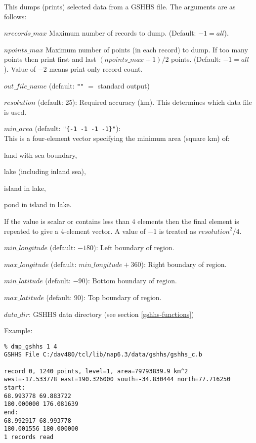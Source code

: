This dumps (prints) selected data from a GSHHS file.
The arguments are as follows:
\begin{simpleitems}
    \item $\mathit{nrecords\_max}$
	Maximum number of records to dump. (Default: $-1=all$).
    \item $\mathit{npoints\_max}$
	Maximum number of points (in each record) to dump.
	If too many points then print first and last $(\mathit{npoints\_max}+1)/2$ points.
	(Default: $-1=all$).
	Value of $-2$ means print only record count.
    \item $\mathit{out\_file\_name}$ (default: \texttt{""} $=$ standard output)
    \item $\mathit{resolution}$ (default: 25):
	Required accuracy (km).
	This determines which data file is used.
    \item $\mathit{min\_area}$ (default: \texttt{"\{-1 -1 -1 -1\}"}): \\
	This is a four-element vector specifying the minimum area (square km) of:
	\begin{bullets}
	    \item land with sea boundary,
	    \item lake (including inland sea),
	    \item island in lake,
	    \item pond in island in lake.
	\end{bullets}
	If the value is scalar or contains less than 4 elements
	then the final element is repeated to give a 4-element vector.
	A value of $-1$ is treated as $\mathit{resolution}^2/4$.
    \item $\mathit{min\_longitude}$ (default: $-180$):
	Left boundary of region. 
    \item $\mathit{max\_longitude}$ (default: $\mathit{min\_longitude} + 360$):
	Right boundary of region.
    \item $\mathit{min\_latitude}$ (default: $-90$):
	Bottom boundary of region.
    \item $\mathit{max\_latitude}$ (default: $90$):
	Top boundary of region.
    \item $\mathit{data\_dir}$:
	GSHHS data directory (see section \ref{gshhs-functions})
\end{simpleitems}

Example: \\
\begin{verbatim}
% dmp_gshhs 1 4
GSHHS File C:/dav480/tcl/lib/nap6.3/data/gshhs/gshhs_c.b

record 0, 1240 points, level=1, area=79793839.9 km^2
west=-17.533778 east=190.326000 south=-34.830444 north=77.716250
start:
68.993778 69.883722
180.000000 176.081639
end:
68.992917 68.993778
180.001556 180.000000
1 records read
\end{verbatim}

